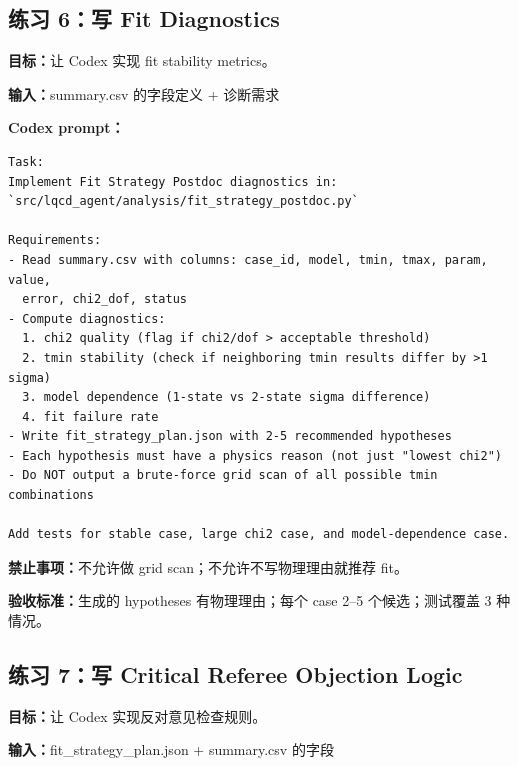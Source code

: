 \documentclass[11pt,a4paper,fontset=fandol]{ctexart}
\begin{document}
\subsection{练习 6：写 Fit Diagnostics}

\textbf{目标：}让 Codex 实现 fit stability metrics。

\textbf{输入：}summary.csv 的字段定义 + 诊断需求

\textbf{Codex prompt：}
\begin{lstlisting}
Task:
Implement Fit Strategy Postdoc diagnostics in:
`src/lqcd_agent/analysis/fit_strategy_postdoc.py`

Requirements:
- Read summary.csv with columns: case_id, model, tmin, tmax, param, value, 
  error, chi2_dof, status
- Compute diagnostics:
  1. chi2 quality (flag if chi2/dof > acceptable threshold)
  2. tmin stability (check if neighboring tmin results differ by >1 sigma)
  3. model dependence (1-state vs 2-state sigma difference)
  4. fit failure rate
- Write fit_strategy_plan.json with 2-5 recommended hypotheses
- Each hypothesis must have a physics reason (not just "lowest chi2")
- Do NOT output a brute-force grid scan of all possible tmin combinations

Add tests for stable case, large chi2 case, and model-dependence case.
\end{lstlisting}

\textbf{禁止事项：}不允许做 grid scan；不允许不写物理理由就推荐 fit。

\textbf{验收标准：}生成的 hypotheses 有物理理由；每个 case 2--5 个候选；测试覆盖 3 种情况。

\subsection{练习 7：写 Critical Referee Objection Logic}

\textbf{目标：}让 Codex 实现反对意见检查规则。

\textbf{输入：}fit\_strategy\_plan.json + summary.csv 的字段
\end{document}
